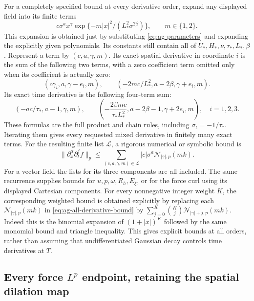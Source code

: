 For a completely specified bound at every derivative order, expand any
displayed field into its finite terms
\[
 c\sigma^a x^\gamma
       \exp\{-m|x|^2/(L_*^2\sigma^{2\beta})\},\qquad m\in\{1,2\}.
\]
This expansion is obtained just by substituting \eqref{eq:ag-parameters}
and expanding the explicitly given polynomials.  Its constants still
contain all of \(U_*,H_*,\nu,\tau_*,L_*,\beta\).
Represent a term by \((c,a,\gamma,m)\).  Its exact spatial derivative
in coordinate \(i\) is the sum of the following two terms, with a zero
coefficient term omitted only when its coefficient is actually zero:
\begin{equation}\label{eq:ag-spatial-recurrence}
 (c\gamma_i,a,\gamma-e_i,m),\qquad
 (-2mc/L_*^2,a-2\beta,\gamma+e_i,m).
\end{equation}
Its exact time derivative is the following four-term sum:
\begin{equation}\label{eq:ag-time-recurrence}
 (-ac/\tau_*,a-1,\gamma,m),\qquad
 \left(-\frac{2\beta mc}{\tau_*L_*^2},
           a-2\beta-1,\gamma+2e_i,m\right),\quad i=1,2,3.
\end{equation}
These formulas are the full product and chain rules, including
\(\sigma_t=-1/\tau_*\).  Iterating them gives every requested mixed
derivative in finitely many exact terms.  For the resulting finite list
\(\mathcal L\), a rigorous numerical or symbolic bound is
\begin{equation}\label{eq:ag-all-derivative-bound}
 \|\partial_x^\alpha\partial_t^j f\|_p
 \leq\sum_{(c,a,\gamma,m)\in\mathcal L}
        |c|\sigma^a\mathcal N_{|\gamma|,p}(mk).
\end{equation}
For a vector field the lists for its three components are all included.
The same recurrence supplies bounds for \(u,p,\omega,R_h,E_\xi\),
or for the force curl using its displayed Cartesian components.
For every nonnegative integer weight \(K\), the corresponding weighted
bound is obtained explicitly by replacing each
\(\mathcal N_{|\gamma|,p}(mk)\) in \eqref{eq:ag-all-derivative-bound}
by \(\sum_{j=0}^K\binom Kj\mathcal N_{|\gamma|+j,p}(mk)\).
Indeed this is the binomial expansion of \((1+|x|)^K\) followed by
the same monomial bound and triangle inequality.
This gives explicit bounds at all orders, rather than assuming that
undifferentiated Gaussian decay controls time derivatives at \(T\).

\subsection{Every force \texorpdfstring{\(L^p\)}{Lp} endpoint, retaining the spatial dilation map}

